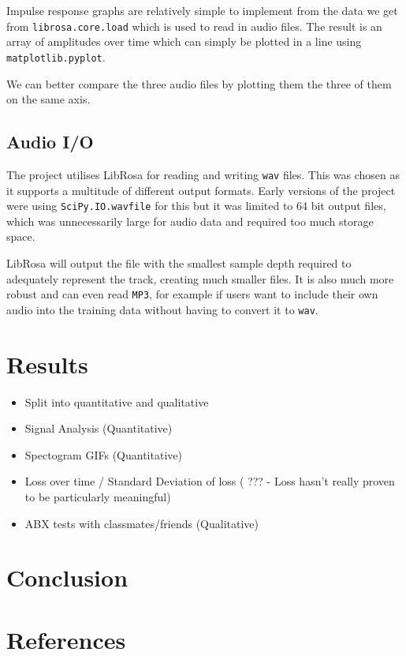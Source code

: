 \documentclass{l4proj}
\providecommand{\tightlist}{%
  \setlength{\itemsep}{0pt}\setlength{\parskip}{0pt}}
\begin{document}
Impulse response graphs are relatively simple to implement from the data
we get from \texttt{librosa.core.load} which is used to read in audio
files. The result is an array of amplitudes over time which can simply
be plotted in a line using \texttt{matplotlib.pyplot}.

We can better compare the three audio files by plotting them the three
of them on the same axis.

\hypertarget{audio-io}{%
\section{Audio I/O}\label{audio-io}}

The project utilises LibRosa for reading and writing \texttt{wav} files.
This was chosen as it supports a multitude of different output formats.
Early versions of the project were using \texttt{SciPy.IO.wavfile} for
this but it was limited to 64 bit output files, which was unnecessarily
large for audio data and required too much storage space.

LibRosa will output the file with the smallest sample depth required to
adequately represent the track, creating much smaller files. It is also
much more robust and can even read \texttt{MP3}, for example if users
want to include their own audio into the training data without having to
convert it to \texttt{wav}.

\hypertarget{results}{%
\chapter{Results}\label{results}}

\begin{itemize}
\tightlist
\item
  Split into quantitative and qualitative
\item
  Signal Analysis (Quantitative)
\item
  Spectogram GIFs (Quantitative)
\item
  Loss over time / Standard Deviation of loss ( ??? - Loss hasn't really
  proven to be particularly meaningful)
\item
  ABX tests with classmates/friends (Qualitative)
\end{itemize}

\hypertarget{conclusion}{%
\chapter{Conclusion}\label{conclusion}}

\hypertarget{references}{%
\chapter{References}\label{references}}
\end{document}
